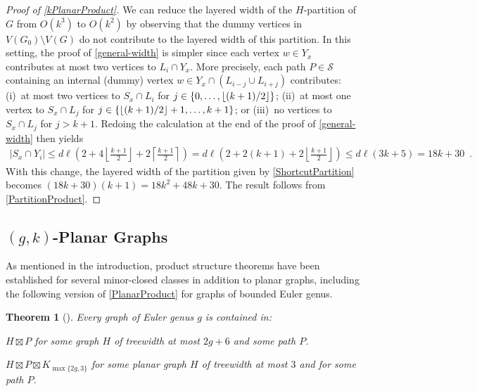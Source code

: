 \documentclass{patmorin}
\theoremstyle{plain}
\newtheorem{thm}{Theorem}
\theoremstyle{definition}
\DeclarePairedDelimiter{\floor}{\lfloor}{\rfloor}
\renewcommand{\SS}{\mathcal{S}}
\renewcommand{\le}{\leqslant}
\begin{document}
\begin{proof}[Proof of \cref{kPlanarProduct}]
	We can reduce the layered width of the $H$-partition of $G$ from $O(k^3)$ to $O(k^2)$ by observing that the dummy vertices in $V(G_0)\setminus V(G)$ do not contribute to the layered width of this partition.  In this setting, the proof of \cref{general-width} is simpler since each vertex $w\in Y_x$ contributes at most two vertices to $L_i\cap Y_x$.  More precisely, each path $P\in\SS$ containing an internal (dummy) vertex $w\in Y_x\cap (L_{i-j}\cup L_{i+j})$ contributes: (i)~at most two vertices to $S_x\cap L_i$ for $j\in\{0,\ldots,\floor{(k+1)/2}\}$; (ii)~at most one vertex to $S_x\cap L_j$ for $j\in\{\floor{(k+1)/2}+1,\ldots,k+1\}$; or (iii)~no vertices to $S_x\cap L_j$ for $j > k+1$.
	Redoing the calculation at the end of the proof of \cref{general-width} then yields
	\begin{align*}
	|S_x\cap Y_i| \le d\ell\left(
	2
	+ 4\left\lfloor\tfrac{k+1}{2}\right\rfloor
	+ 2\left\lceil\tfrac{k+1}{2}\right\rceil
	\right)
	 =
	d\ell\left(
	2 + 2(k+1) + 2\left\lfloor\tfrac{k+1}{2}\right\rfloor
	\right)
	 \le
	d\ell(3k+5)
	= 18k+30 \enspace .
	\end{align*}
	With this change, the layered width of the partition given by \cref{ShortcutPartition} becomes $(18k+30)(k+1)=18k^2+48k+30$.
	The result follows from \cref{PartitionProduct}.
\end{proof}



\subsection{\boldmath $(g,k)$-Planar Graphs}
\label{gk_planar_section}

As mentioned in the introduction, product structure theorems have been established for several minor-closed classes in addition to planar graphs, including the following version of \cref{PlanarProduct} for graphs of bounded Euler genus.

\begin{thm}[\citep{DJMMUW20,UWY,DHHW}]\label{GenusProduct}
  Every graph of Euler genus $g$ is contained in:
  \begin{compactenum}[(a)]
  \item $H  \boxtimes P$ for some graph $H$ of treewidth at most $2g+6$  and some path $P$.
  \item $H \boxtimes P \boxtimes K_{\max\{2g,3\}}$ for some planar graph $H$ of treewidth at most $3$ and for some path $P$.
  \end{compactenum}
\end{thm}
\end{document}
